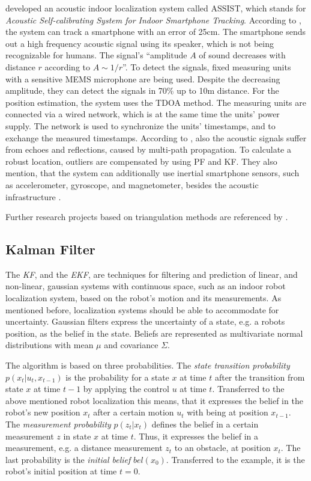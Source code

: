 \citet{hoflinger:acoustic} developed an acoustic indoor localization system called ASSIST, which stands for \emph{Acoustic Self-calibrating System for Indoor Smartphone Tracking}. According to \citet{hoflinger:acoustic}, the system can track a smartphone with an error of 25cm. The smartphone sends out a high frequency acoustic signal using its speaker, which is not being recognizable for humans. The signal's ``amplitude $A$ of sound decreases with distance $r$ according to $A \sim 1/r$''. To detect the signals, fixed measuring units with a sensitive \ac{MEMS} microphone are being used. Despite the decreasing amplitude, they can detect the signals in 70\% up to 10m distance. For the position estimation, the system uses the \ac{TDOA} method. The measuring units are connected via a wired network, which is at the same time the units' power supply. The network is used to synchronize the units' timestamps, and to exchange the measured timestamps. According to \citet{hoflinger:acoustic}, also the acoustic signals suffer from echoes and reflections, caused by multi-path propagation. To calculate a robust location, outliers are compensated by using \ac{PF} and \ac{KF}. They also mention, that the system can additionally use inertial smartphone sensors, such as accelerometer, gyroscope, and magnetometer, besides the acoustic infrastructure \citep{hoflinger:acoustic, hoflinger:assist}.

Further research projects based on triangulation methods are referenced by \citet{IEEE:survey_wireless_indoor_pos}.


\subsection{Kalman Filter}\label{sec:fund_kf}
The \emph{\ac{KF}}, and the \emph{\ac{EKF}}, are techniques for filtering and prediction of linear, and non-linear, gaussian systems with continuous space, such as an indoor robot localization system, based on the robot's motion and its measurements. As mentioned before, localization systems should be able to accommodate for uncertainty. Gaussian filters express the uncertainty of a state, e.g. a robots position, as the belief in the state. Beliefs are represented as multivariate normal distributions with mean $\mu$ and covariance $\Sigma$. %

The algorithm is based on three probabilities. The \emph{state transition probability} $p(x_t | u_t , x_{t-1})$ is the probability for a state $x$ at time $t$ after the transition from state $x$ at time $t-1$ by applying the control $u$ at time $t$. Transferred to the above mentioned robot localization this means, that it expresses the belief in the robot's new position $x_t$ after a certain motion $u_t$ with being at position $x_{t-1}$. The \emph{measurement probability} $p(z_t|x_t)$ defines the belief in a certain measurement $z$ in state $x$ at time $t$. Thus, it expresses the belief in a measurement, e.g. a distance measurement $z_t$ to an obstacle, at position $x_t$. The last probability is the \emph{initial belief} $bel(x_0)$. Transferred to the example, it is the robot's initial position at time $t = 0$.

